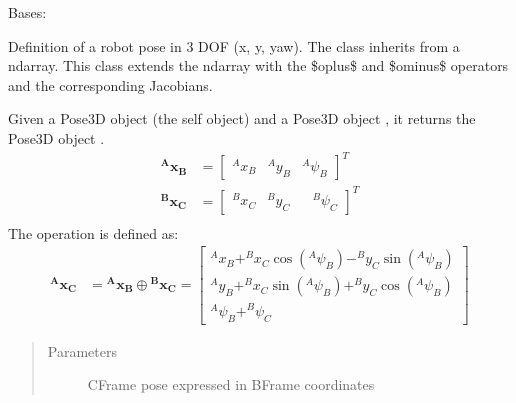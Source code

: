 \documentclass[letterpaper,10pt,english]{sphinxmanual}
\begin{document}
\begin{fulllineitems}
\label{\detokenize{compounding:Pose3D.Pose3D}}
\sphinxAtStartPar
Bases: 

\sphinxAtStartPar
Definition of a robot pose in 3 DOF (x, y, yaw). The class inherits from a ndarray.
This class extends the ndarray with the \$oplus\$ and \$ominus\$ operators and the corresponding Jacobians.

\begin{fulllineitems}
\label{\detokenize{compounding:Pose3D.Pose3D.oplus}}
\sphinxAtStartPar
Given a Pose3D object  (the self object) and a Pose3D object , it returns the Pose3D object .
\begin{equation*}
\begin{split}\mathbf{{^A}x_B} &= \begin{bmatrix} ^Ax_B & ^Ay_B & ^A\psi_B \end{bmatrix}^T \\
\mathbf{{^B}x_C} &= \begin{bmatrix} ^Bx_C & ^By_C & & ^B\psi_C \end{bmatrix}^T \\\end{split}
\end{equation*}
\sphinxAtStartPar
The operation is defined as:
\begin{equation}\label{equation:compounding:eq-oplus3dof}
\begin{split}\mathbf{{^A}x_C} &= \mathbf{{^A}x_B} \oplus \mathbf{{^B}x_C} =
\begin{bmatrix}
    ^Ax_B + ^Bx_C  \cos(^A\psi_B) - ^By_C  \sin(^A\psi_B) \\
    ^Ay_B + ^Bx_C  \sin(^A\psi_B) + ^By_C  \cos(^A\psi_B) \\
    ^A\psi_B + ^B\psi_C
\end{bmatrix}\end{split}
\end{equation}\begin{quote}\begin{description}
\item[{Parameters}] \leavevmode
\sphinxAtStartPar
{} \textendash{} C\sphinxhyphen{}Frame pose expressed in B\sphinxhyphen{}Frame coordinates


\end{description}
\end{quote}
\end{fulllineitems}
\end{fulllineitems}
\end{document}
